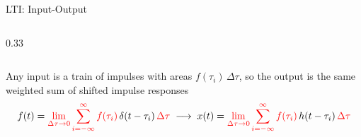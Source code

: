 \documentclass[12pt, aspectratio=169]{beamer}
\begin{document}
\begin{frame}{LTI: Input-Output}
\begin{columns}[c]
\begin{column}{0.33\textwidth}
        \end{column}
    \end{columns}
    \vspace{1em}
    Any input is a train of impulses with areas $f(\tau_i)\,\Delta\tau$, so the output is the
    same weighted sum of shifted impulse responses
    \[
        f(t) = \textcolor{red}{ \lim_{\Delta \tau \to 0}\sum_{i=-\infty}^{\infty} f(\tau_i)}\,\delta(t - \tau_i)\, \textcolor{red}{\Delta \tau} \;\longrightarrow\; x(t) = \textcolor{red}{ \lim_{\Delta \tau \to 0}\sum_{i=-\infty}^{\infty} f(\tau_i)}\,h(t - \tau_i)\, \textcolor{red}{\Delta \tau}
    \]
\end{frame}


\end{document}
